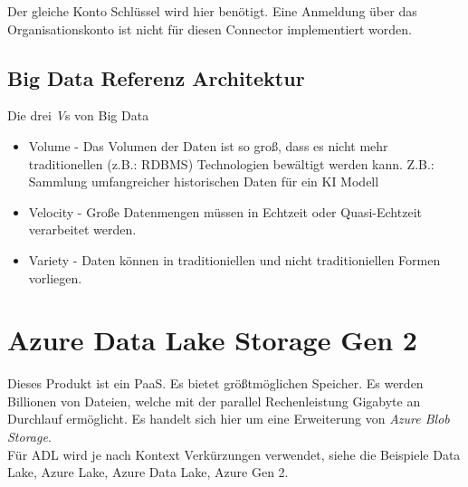 Der gleiche Konto Schlüssel wird hier benötigt. Eine Anmeldung über das Organisationskonto ist nicht für diesen Connector implementiert worden.

\subsection{Big Data Referenz Architektur}
Die drei \textit{V}s von Big Data

\begin{itemize}
	\item Volume - Das Volumen der Daten ist so groß, dass es nicht mehr traditionellen (z.B.: \gls{RDBMS}) Technologien bewältigt werden kann. Z.B.: Sammlung umfangreicher historischen Daten für ein \gls{KI} Modell	
	\item Velocity - Große Datenmengen müssen in Echtzeit oder Quasi-Echtzeit verarbeitet werden.
	\item Variety - Daten können in traditioniellen und nicht traditioniellen Formen vorliegen.
\end{itemize}

\section{Azure Data Lake Storage Gen 2}

Dieses Produkt ist ein \gls{PaaS}. Es bietet größtmöglichen Speicher. Es werden Billionen von Dateien, welche mit der parallel Rechenleistung Gigabyte an Durchlauf ermöglicht. Es handelt sich hier um eine Erweiterung von \textit{Azure Blob Storage}.\\

Für \gls{ADL} wird je nach Kontext Verkürzungen verwendet, siehe die Beispiele Data Lake, Azure Lake, Azure Data Lake, Azure Gen 2.


